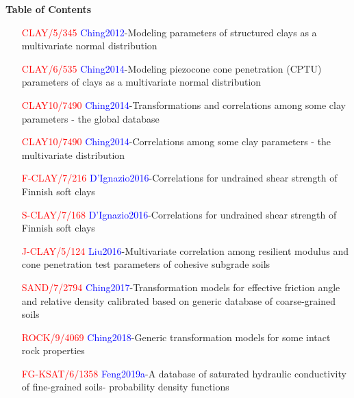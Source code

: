 \documentclass[12pt]{book}
\begin{document}
	
	\cleardoublepage

	\begin{center}
		\bfseries\centering\Large Table of Contents
	\end{center}
	\par

	\begin{itemize}
		\item[\textcolor{red}{CLAY/5/345}] \textcolor{blue}{Ching2012}-Modeling parameters of structured clays as a multivariate normal distribution \hfill\textcolor{red}{\pageref{bib:1}}
		\item[\textcolor{red}{CLAY/6/535}] \textcolor{blue}{Ching2014}-Modeling piezocone cone penetration (CPTU) parameters of clays as a multivariate normal distribution \hfill\textcolor{red}{\pageref{bib:2}}
		\item[\textcolor{red}{CLAY10/7490}] \textcolor{blue}{Ching2014}-Transformations and correlations among some clay parameters - the global database \hfill\textcolor{red}{\pageref{bib:3}}
		\item[\textcolor{red}{CLAY10/7490}] \textcolor{blue}{Ching2014}-Correlations among some clay parameters - the multivariate distribution \hfill\textcolor{red}{\pageref{bib:4}}
		\item[\textcolor{red}{F-CLAY/7/216}] \textcolor{blue}{D’Ignazio2016}-Correlations for undrained shear strength of Finnish soft clays \hfill\textcolor{red}{\pageref{bib:5}}
		\item[\textcolor{red}{S-CLAY/7/168}] \textcolor{blue}{D’Ignazio2016}-Correlations for undrained shear strength of Finnish soft clays \hfill\textcolor{red}{\pageref{bib:6}}
		\item[\textcolor{red}{J-CLAY/5/124}] \textcolor{blue}{Liu2016}-Multivariate correlation among resilient modulus and cone penetration test parameters of cohesive subgrade soils \hfill\textcolor{red}{\pageref{bib:7}}
		\item[\textcolor{red}{SAND/7/2794}] \textcolor{blue}{Ching2017}-Transformation models for effective friction angle and relative density calibrated based on generic database of coarse-grained soils \hfill\textcolor{red}{\pageref{bib:8}}
		\item[\textcolor{red}{ROCK/9/4069}] \textcolor{blue}{Ching2018}-Generic transformation models for some intact rock properties \hfill\textcolor{red}{\pageref{bib:9}}
		\item[\textcolor{red}{FG-KSAT/6/1358}] \textcolor{blue}{Feng2019a}-A database of saturated hydraulic conductivity of fine-grained soils- probability density functions \hfill\textcolor{red}{\pageref{bib:10}}

\end{itemize}
\end{document}

